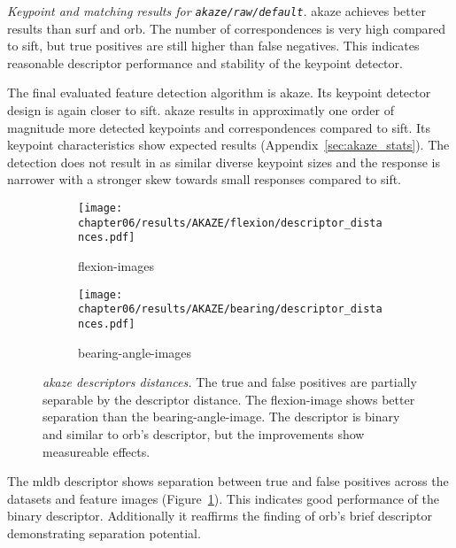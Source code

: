 \begin{table}[H]
    {\renewcommand{\arraystretch}{1.2}%
    \setlength{\tabcolsep}{0.3em}%
    \footnotesize

    }
    \caption[Keypoint and matching results for \texttt{\acrshort{akaze}/raw/default}]{\emph{Keypoint and matching results for \texttt{\acrshort{akaze}/raw/default}.} \acrshort{akaze} achieves better results than \acrshort{surf} and \acrshort{orb}. The number of correspondences is very high compared to \acrshort{sift}, but true positives are still higher than false negatives. This indicates reasonable descriptor performance and stability of the keypoint detector.}
\end{table}
The final evaluated feature detection algorithm is \acrshort{akaze}.
Its keypoint detector design is again closer to \acrshort{sift}.
\acrshort{akaze} results in approximatly one order of magnitude more detected keypoints and correspondences compared to \acrshort{sift}.
Its keypoint characteristics show expected results (Appendix~\ref{sec:akaze_stats}).
The detection does not result in as similar diverse keypoint sizes and the response is narrower with a stronger skew towards small responses compared to \acrshort{sift}.
\begin{figure}[b!]
\begin{subfigure}[t]{0.45\linewidth}
    \texttt{[image: chapter06/results/AKAZE/flexion/descriptor\_distances.pdf]}%
    \caption{\glspl{flexion-image}}
\end{subfigure}\quad
\begin{subfigure}[t]{0.45\linewidth}
    \texttt{[image: chapter06/results/AKAZE/bearing/descriptor\_distances.pdf]}%
    \caption{\glspl{bearing-angle-image}}
\end{subfigure}
\caption[\acrshort{akaze} descriptors distances]{\emph{\acrshort{akaze} descriptors distances.} The true and false positives are partially separable by the descriptor distance. The \gls{flexion-image} shows better separation than the \gls{bearing-angle-image}. The descriptor is binary and similar to \acrshort{orb}'s descriptor, but the improvements show measureable effects.}\label{fig:descriptor_akaze}
\end{figure}
The \acrshort{mldb} descriptor shows separation between true and false positives across the datasets and feature images (Figure~\ref{fig:descriptor_akaze}).
This indicates good performance of the binary descriptor.
Additionally it reaffirms the finding of \acrshort{orb}'s \acrshort{brief} descriptor demonstrating separation potential.
